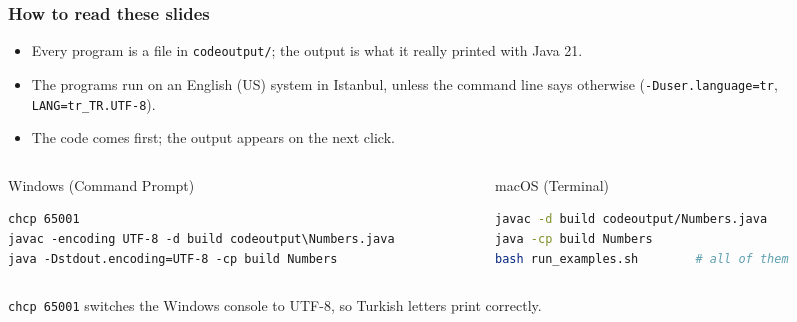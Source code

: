 \documentclass[aspectratio=169,10pt,compress]{beamer}
\begin{document}
\begin{frame}[t,fragile] \frametitle{How to read these slides}
  \begin{itemize}\small
    \item Every program is a file in \texttt{codeoutput/}; the output is what it really printed with Java 21.
    \item The programs run on an English (US) system in Istanbul, unless the command line says otherwise
      (\texttt{-Duser.language=tr}, \texttt{LANG=tr\_TR.UTF-8}).
    \item The code comes first; the output appears on the next click. 
  \end{itemize}
  \begin{columns}[T]
    \begin{column}{0.48\textwidth}
      \begin{block}{Windows (Command Prompt)}


\begin{lstlisting}[style=codesnippet, language={}, basicstyle=\ttfamily\scriptsize]
chcp 65001
javac -encoding UTF-8 -d build codeoutput\Numbers.java
java -Dstdout.encoding=UTF-8 -cp build Numbers
\end{lstlisting}


      \end{block}
    \end{column}
    \begin{column}{0.48\textwidth}
      \begin{block}{macOS (Terminal)}


\begin{lstlisting}[style=codesnippet, language=bash, basicstyle=\ttfamily\scriptsize]
javac -d build codeoutput/Numbers.java
java -cp build Numbers
bash run_examples.sh        # all of them
\end{lstlisting}


      \end{block}
    \end{column}
  \end{columns}

  \small \texttt{chcp 65001} switches the Windows console to UTF-8, so Turkish letters print correctly.
\end{frame}
\end{document}

